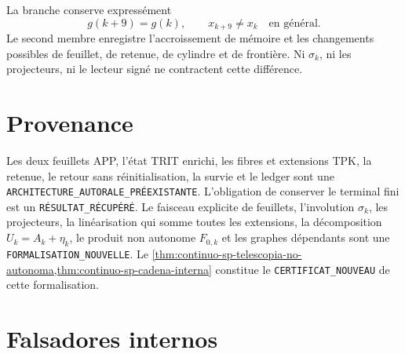 La branche conserve expressément
\begin{equation}
\label{eq:continuo-sp-no-reset}
 g(k+9)=g(k),
 \qquad
 x_{k+9}\neq x_k\quad\text{en général}.
\end{equation}
Le second membre enregistre l'accroissement de mémoire et les changements possibles
de feuillet, de retenue, de cylindre et de frontière. Ni \(\sigma_k\), ni les projecteurs, ni
le lecteur signé ne contractent cette différence.

\section{Provenance}

Les deux feuillets APP, l'état TRIT enrichi, les fibres et extensions TPK,
la retenue, le retour sans réinitialisation, la survie et le ledger sont une
\texttt{ARCHITECTURE\_AUTORALE\_PRÉEXISTANTE}. L'obligation de conserver le
terminal fini est un \texttt{RÉSULTAT\_RÉCUPÉRÉ}. Le faisceau explicite de feuillets,
l'involution \(\sigma_k\), les projecteurs, la linéarisation qui somme toutes
les extensions, la décomposition \(U_k=A_k+\eta_k\), le produit non
autonome \(F_{0,k}\) et les graphes dépendants sont une
\texttt{FORMALISATION\_NOUVELLE}. Le
\cref{thm:continuo-sp-telescopia-no-autonoma,thm:continuo-sp-cadena-interna}
constitue le \texttt{CERTIFICAT\_NOUVEAU} de cette formalisation.

\section{Falsadores internos}

